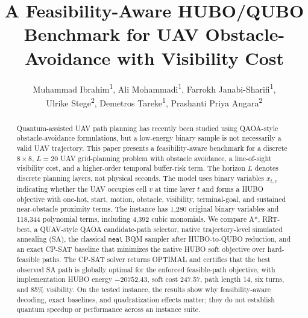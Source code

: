 \documentclass[letterpaper]{article} %
\title{A Feasibility-Aware HUBO/QUBO Benchmark for UAV Obstacle-Avoidance with Visibility Cost}
\author{
Muhammad Ibrahim\textsuperscript{\rm 1},
Ali Mohammadi\textsuperscript{\rm 1},
Farrokh Janabi-Sharifi\textsuperscript{\rm 1},\\
Ulrike Stege\textsuperscript{\rm 2},
Demetros Tareke\textsuperscript{\rm 1},
Prashanti Priya Angara\textsuperscript{\rm 2}
}
\makeatletter
\renewcommand{\maketitle}{%
  \par
  \begingroup
    \def\thefootnote{\fnsymbol{footnote}}%
    \@maketitle
    \@thanks
  \endgroup
  \setcounter{footnote}{0}%
  \let\maketitle\relax
  \let\@maketitle\relax
  \gdef\@thanks{}%
  \gdef\@author{}%
  \gdef\@title{}%
  \let\thanks\relax
}
\makeatother
\begin{document}
\onecolumn
\maketitle

\begin{abstract}
Quantum-assisted UAV path planning has recently been studied using QAOA-style obstacle-avoidance formulations, but a low-energy binary sample is not necessarily a valid UAV trajectory. This paper presents a feasibility-aware benchmark for a discrete $8\times8$, $L=20$ UAV grid-planning problem with obstacle avoidance, a line-of-sight visibility cost, and a higher-order temporal buffer-risk term. The horizon $L$ denotes discrete planning layers, not physical seconds. The model uses binary variables $x_{t,v}$ indicating whether the UAV occupies cell $v$ at time layer $t$ and forms a HUBO objective with one-hot, start, motion, obstacle, visibility, terminal-goal, and sustained near-obstacle proximity terms. The instance has 1,280 original binary variables and 118,344 polynomial terms, including 4,392 cubic monomials. We compare A*, RRT-best, a QUAV-style QAOA candidate-path selector, native trajectory-level simulated annealing (SA), the classical \texttt{neal} BQM sampler after HUBO-to-QUBO reduction, and an exact CP-SAT baseline that minimizes the native HUBO soft objective over hard-feasible paths. The CP-SAT solver returns OPTIMAL and certifies that the best observed SA path is globally optimal for the enforced feasible-path objective, with implementation HUBO energy $-20752.43$, soft cost 247.57, path length 14, six turns, and 85\% visibility. On the tested instance, the results show why feasibility-aware decoding, exact baselines, and quadratization effects matter; they do not establish quantum speedup or performance across an instance suite.
\end{abstract}
\end{document}
